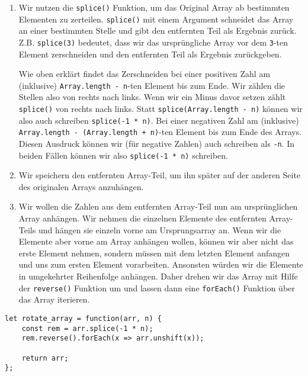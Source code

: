 \documentclass{book}
\begin{document}
\begin{enumerate} 
	\item Wir nutzen die \lstinline|splice()| Funktion, um das Original Array ab bestimmten Elementen zu zerteilen. \lstinline|splice()| mit einem Argument schneidet das Array an einer bestimmten Stelle und gibt den entfernten Teil als Ergebnis zurück. Z.B. \lstinline|splice(3)| bedeutet, dass wir das ursprüngliche Array vor dem \lstinline|3|-ten Element zerschneiden und den entfernten Teil als Ergebnis zurückgeben.
	
	Wie oben erklärt findet das Zerschneiden bei einer positiven Zahl am (inklusive) \lstinline|Array.length - n|-ten Element bis zum Ende. Wir zählen die Stellen also von rechts nach links. Wenn wir ein Minus davor setzen zählt \lstinline|splice()| von rechts nach links. Statt \lstinline|splice(Array.length - n)| können wir also auch schreiben \lstinline|splice(-1 * n)|. Bei einer negativen Zahl am (inklusive) \lstinline|Array.length - (Array.length + n)|-ten Element bis zum Ende des Arrays. Diesen Ausdruck können wir (für negative Zahlen) auch schreiben als \lstinline|-n|. In beiden Fällen können wir also \lstinline|splice(-1 * n)| schreiben.
	\item Wir speichern den entfernten Array-Teil, um ihn später auf der anderen Seite des originalen Arrays anzuhängen.
	\item Wir wollen die Zahlen aus dem entfernten Array-Teil nun am ursprünglichen Array anhängen. Wir nehmen die einzelnen Elemente des entfernten Array-Teils und hängen sie einzeln vorne am Ursprungsarray an. Wenn wir die Elemente aber vorne am Array anhängen wollen, können wir aber nicht das erste Element nehmen, sondern müssen mit dem letzten Element anfangen und uns zum ersten Element vorarbeiten. Ansonsten würden wir die Elemente in umgekehrter Reihenfolge anhängen. Daher drehen wir das Array mit Hilfe der \lstinline|reverse()| Funktion um und lassen dann eine \lstinline|forEach()| Funktion über das Array iterieren. 
	
\end{enumerate}

\begin{lstlisting}[caption=My Javascript Example]
let rotate_array = function(arr, n) {
	const rem = arr.splice(-1 * n);
	rem.reverse().forEach(x => arr.unshift(x));    

	return arr;
};
\end{lstlisting}
\end{document}
